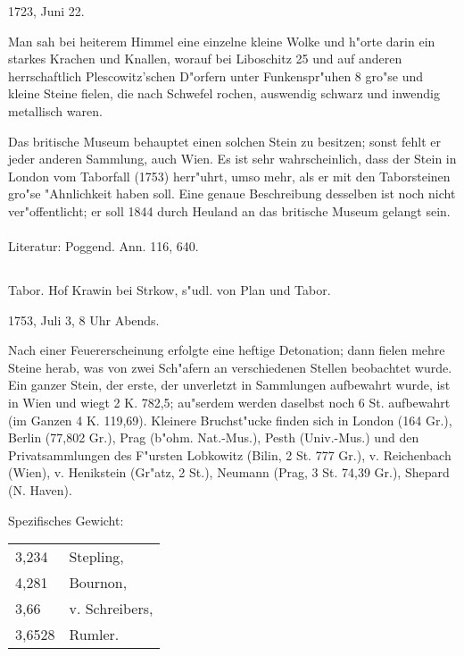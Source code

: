 \documentclass[a4paper, 11pt, oneside]{article}
\begin{document}
1723, Juni 22.

Man sah bei heiterem Himmel eine einzelne kleine Wolke und h"orte darin ein starkes Krachen und Knallen, worauf bei Liboschitz 25 und auf anderen herrschaftlich Plescowitz'schen D"orfern unter Funkenspr"uhen 8 gro"se und kleine Steine fielen, die nach Schwefel rochen, auswendig schwarz und inwendig metallisch waren.

Das britische Museum behauptet einen solchen Stein zu besitzen; sonst fehlt er jeder anderen Sammlung, auch Wien. Es ist sehr wahrscheinlich, dass der Stein in London vom Taborfall (1753) herr"uhrt, umso mehr, als er mit den Taborsteinen gro"se "Ahnlichkeit haben soll. Eine genaue Beschreibung desselben ist noch nicht ver"offentlicht; er soll 1844 durch Heuland an das britische Museum gelangt sein.
\normalsize
\paragraph{}
Literatur: Poggend. Ann. 116, 640.
\subsection{}
\LARGE
\paragraph{}
Tabor. Hof Krawin bei Strkow, s"udl. von Plan und Tabor.

1753, Juli 3, 8 Uhr Abends.

Nach einer Feuererscheinung erfolgte eine heftige Detonation; dann fielen mehre Steine herab, was von zwei Sch"afern an verschiedenen Stellen beobachtet wurde. Ein ganzer Stein, der erste, der unverletzt in Sammlungen aufbewahrt wurde, ist in Wien und wiegt 2 K. 782,5; au"serdem werden daselbst noch 6 St. aufbewahrt (im Ganzen 4 K. 119,69). Kleinere Bruchst"ucke finden sich in London (164 Gr.), Berlin (77,802 Gr.), Prag (b"ohm. Nat.-Mus.), Pesth (Univ.-Mus.) und den Privatsammlungen des F"ursten Lobkowitz (Bilin, 2 St. 777 Gr.), v. Reichenbach (Wien), v. Henikstein (Gr"atz, 2 St.), Neumann (Prag, 3 St. 74,39 Gr.), Shepard (N. Haven).

Spezifisches Gewicht:
\begin{table}[!ht]
    \centering\swabfamily\Large
    \begin{tabular}{l l}
        3,234 & Stepling,\\
        4,281 & Bournon,\\
        3,66 & v. Schreibers,\\
        3,6528 & Rumler.
    \end{tabular}
\end{table}
\end{document}
